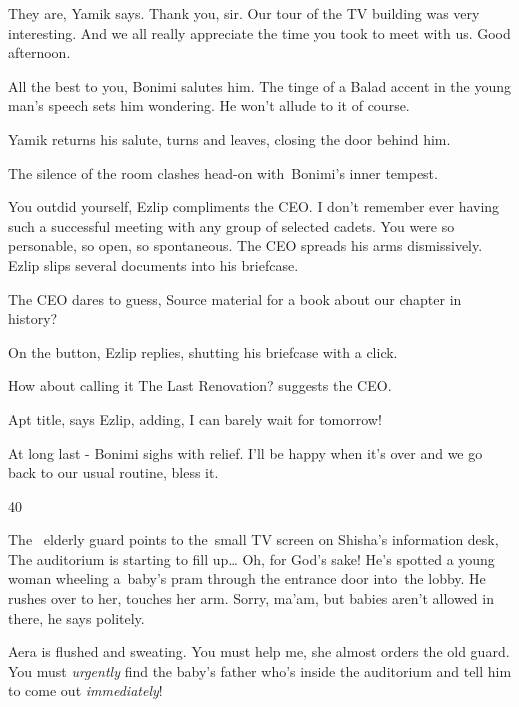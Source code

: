\documentclass[12pt]{book}
\begin{document}
{\textquotedbl}They are,{\textquotedbl} Yamik says. {\textquotedbl}Thank you, sir. Our tour of the TV building was very
interesting. And we all really appreciate the time you took to meet with us. Good afternoon.{\textquotedbl}

{\textquotedbl}All the best to you,{\textquotedbl} Bonimi salutes him. The tinge of a Balad accent in the young man's
speech sets him wondering. He won't allude to it of course.

Yamik returns his salute, turns and leaves, closing the door behind him.

The silence of the room clashes head-on with~Bonimi's inner tempest.

{\textquotedbl}You outdid yourself,{\textquotedbl} Ezlip compliments the CEO. {\textquotedbl}I don't remember ever
having such a successful meeting with any group of selected cadets. You were so personable, so open, so
spontaneous.{\textquotedbl} The CEO spreads his arms dismissively. Ezlip slips several documents into his
briefcase.\textbf{ }

The CEO dares to guess, {\textquotedbl}Source material for a book about our chapter in history?{\textquotedbl}

{\textquotedbl}On the button,{\textquotedbl} Ezlip replies, shutting his briefcase with a click.

{\textquotedbl}How about calling it The Last Renovation?{\textquotedbl} suggests the CEO.

{\textquotedbl}Apt title,{\textquotedbl} says Ezlip, adding, {\textquotedbl}I can barely wait for
tomorrow!{\textquotedbl}

{\textquotedbl}At long last -{\textquotedbl} Bonimi sighs with relief. {\textquotedbl}I'll be happy when it's over and
we go back to our usual routine, bless it.{\textquotedbl}


\bigskip

40

The ~elderly guard points to the~small TV screen on Shisha's information desk, {\textquotedbl}The auditorium is starting
to fill up{\dots} Oh, for God's sake!{\textquotedbl} He's spotted a young woman wheeling a~baby's pram through the
entrance door into~the lobby. He rushes{ }over to her, touches her arm.
{\textquotedbl}Sorry, ma'am, but babies aren't allowed in there,{\textquotedbl} he says politely.

Aera is flushed and sweating. {\textquotedbl}You must help me,{\textquotedbl} she almost orders the old guard.
{\textquotedbl}You must \textit{urgently} find the baby's father who's inside the auditorium and tell him to come out
\textit{immediately}!{\textquotedbl}
\end{document}
